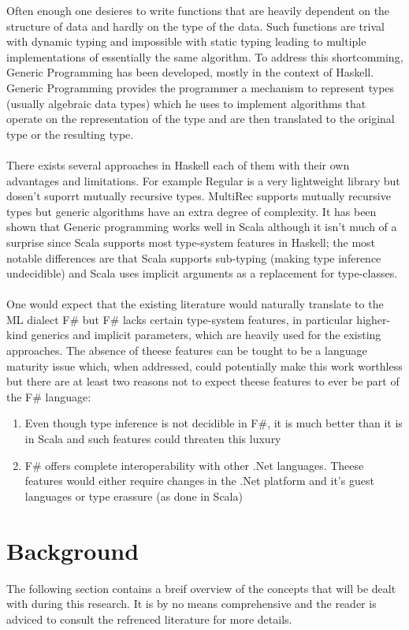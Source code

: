 \documentclass[8pt]{extarticle}
\begin{document}
Often enough one desieres to write functions that are heavily dependent on the structure of data and hardly on the type of the data. Such functions are trival with dynamic typing and impossible with static typing leading to multiple implementations of essentially the same algorithm. To address this shortcomming, Generic Programming has been developed, mostly in the context of Haskell. Generic Programming provides the programmer a mechanism to represent types (usually algebraic data types) which he uses to implement algorithms that operate on the representation of the type and are then translated to the original type or the resulting type.
\\\\
There exists several approaches in Haskell\cite{SYB,Regular,MultiRec} each of them with their own advantages and limitations. For example Regular\cite{Regular} is a very lightweight library but dosen't suporrt mutually recursive types. MultiRec\cite{MultiRec} supports mutually recursive types but generic algorithms have an extra degree of complexity. It has been shown that Generic programming works well in Scala\cite{ScalaGen} although it isn't much of a surprise since Scala supports most type-system features in Haskell; the most notable differences are that Scala supports sub-typing (making type inference undecidible) and Scala uses implicit arguments as a replacement for type-classes.
\\\\
One would expect that the existing literature would naturally translate to the ML dialect F\# but F\# lacks certain type-system features, in particular higher-kind generics and implicit parameters, which are heavily used for the existing approaches\cite{SYB,Regular,MultiRec}. The absence of theese features can be tought to be a language maturity issue which, when addressed, could potentially make this work worthless but there are at least two reasons not to expect theese features to ever be part of the F\# language:
\begin{enumerate}
  \item Even though type inference is not decidible in F\#, it is much better than it is in Scala and such features could threaten this luxury
  \item F\# offers complete interoperability with other .Net languages. Theese features would either require changes in the .Net platform and it's guest languages or type erassure (as done in Scala)
\end{enumerate}
\section{Background}
The following section contains a breif overview of the concepts that will be dealt with during this research. It is by no means comprehensive and the reader is adviced to consult the refrenced literature for more details.
\end{document}
